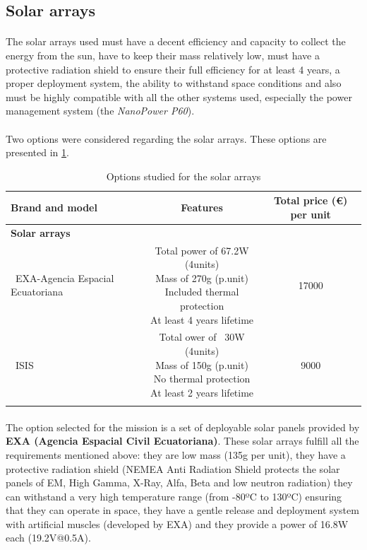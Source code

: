 \subsection{Solar arrays}

\paragraph{}The solar arrays used must have a decent efficiency and capacity to collect the energy from the sun, have to keep their mass relatively low, must have a protective radiation shield to ensure their full efficiency for at least 4 years, a proper deployment system, the ability to withstand space conditions and also must be highly compatible with all the other systems used, especially the power management system (the \textit{NanoPower P60}).

\paragraph{}Two options were considered regarding the solar arrays. These options are presented in \ref{solararraysoptions}.

\begin{longtable}{| l | c | c | }
\hline
\rowcolor[gray]{0.80}	\textbf{Brand and model} &  \textbf{Features}     & \textbf{Total price (\euro) per unit}   \\
\hline
\endfirsthead

\rowcolor[gray]{0.85} \textbf{Solar arrays} &  &  \\
	   ~EXA-Agencia Espacial Ecuatoriana & \makecell{Total power of 67.2W (4units)\\ Mass of 270g (p.unit) \\ Included thermal protection \\At least 4 years lifetime} & 17000 \\
	   \hline
	   ~ISIS & \makecell{Total ower of ~30W (4units) \\ Mass of 150g (p.unit) \\ No thermal protection \\At least 2 years lifetime} & 9000 \\
	   \hline
\caption{Options studied for the solar arrays}
\label{solararraysoptions}
\end{longtable}

\paragraph{}The option selected for the mission is a set of deployable solar panels provided by \textbf{EXA (Agencia Espacial Civil Ecuatoriana)}. These solar arrays fulfill all the requirements mentioned above: they are low mass (135g per unit), they have a protective radiation shield (NEMEA Anti Radiation Shield protects the solar panels of EM, High Gamma, X-Ray, Alfa, Beta and low neutron radiation) they can withstand a very high temperature range (from -80ºC to 130ºC) ensuring that they can operate in space, they have a gentle release and deployment system with artificial muscles (developed by EXA) and they provide a power of 16.8W each (19.2V@0.5A).

